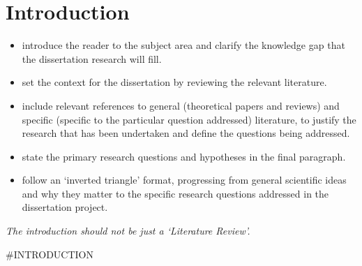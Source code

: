 \documentclass[
  11pt,
]{article}
\providecommand{\tightlist}{%
  \setlength{\itemsep}{0pt}\setlength{\parskip}{0pt}}
\begin{document}
\hypertarget{introduction}{%
\section{Introduction}\label{introduction}}

\begin{itemize}
\tightlist
\item
  introduce the reader to the subject area and clarify the knowledge gap
  that the dissertation research will fill.
\item
  set the context for the dissertation by reviewing the relevant
  literature.
\item
  include relevant references to general (theoretical papers and
  reviews) and specific (specific to the particular question addressed)
  literature, to justify the research that has been undertaken and
  define the questions being addressed.
\item
  state the primary research questions and hypotheses in the final
  paragraph.
\item
  follow an `inverted triangle' format, progressing from general
  scientific ideas and why they matter to the specific research
  questions addressed in the dissertation project.
\end{itemize}

\emph{The introduction should not be just a `Literature Review'.}

\begin{centering}
#INTRODUCTION
\end{centering}
\end{document}
